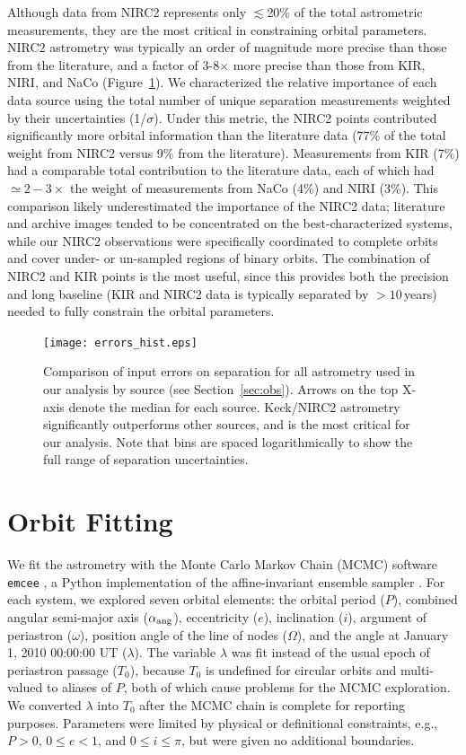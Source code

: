 \documentclass[twocolumn]{aastex62}
\begin{document}
Although data from NIRC2 represents only $\lesssim$20\% of the total astrometric measurements, they are the most critical in constraining orbital parameters. NIRC2 astrometry was typically an order of magnitude more precise than those from the literature, and a factor of 3-8$\times$ more precise than those from KIR, NIRI, and NaCo (Figure~\ref{fig:errors}). We characterized the relative importance of each data source using the total number of unique separation measurements weighted by their uncertainties (1/$\sigma$). Under this metric, the NIRC2 points contributed significantly more orbital information than the literature data (77\% of the total weight from NIRC2 versus 9\% from the literature). Measurements from KIR (7\%) had a comparable total contribution to the literature data, each of which had $\simeq2-3\times$ the weight of measurements from NaCo (4\%) and NIRI (3\%). This comparison likely underestimated the importance of the NIRC2 data; literature and archive images tended to be concentrated on the best-characterized systems, while our NIRC2 observations were specifically coordinated to complete orbits and cover under- or un-sampled regions of binary orbits. The combination of NIRC2 and KIR points is the most useful, since this provides both the precision and long baseline (KIR and NIRC2 data is typically separated by $>10$\,years) needed to fully constrain the orbital parameters.

\begin{figure}[htb]
\begin{center}
\texttt{[image: errors\_hist.eps]}
\caption{Comparison of input errors on separation for all astrometry used in our analysis by source (see Section~\ref{sec:obs}). Arrows on the top X-axis denote the median for each source. Keck/NIRC2 astrometry significantly outperforms other sources, and is the most critical for our analysis. Note that bins are spaced logarithmically to show the full range of separation uncertainties. }
\label{fig:errors}
\end{center}
\end{figure}


\section{Orbit Fitting}\label{sec:orbit}
We fit the astrometry with the Monte Carlo Markov Chain (MCMC) software {\tt emcee} \citep{Foreman-Mackey2013}, a Python implementation of the affine-invariant ensemble sampler \citep{goodman2010}. For each system, we explored seven orbital elements: the orbital period ($P$), combined angular semi-major axis ($\alpha_{\rm{ang}}$), eccentricity ($e$), inclination ($i$), argument of periastron ($\omega$), position angle of the line of nodes ($\Omega$), and 
the angle at January 1, 2010 00:00:00 UT ($\lambda$). The variable $\lambda$ was fit instead of the usual epoch of periastron passage ($T_0$), because $T_0$ is undefined for circular orbits and multi-valued to aliases of $P$, both of which cause problems for the MCMC exploration. We converted $\lambda$ into $T_0$ after the MCMC chain is complete for reporting purposes. Parameters were limited by physical or definitional constraints, e.g., $P>0$, $0 \le e<1$, and $0\le i \le \pi$, but were given no additional boundaries. 
\end{document}
